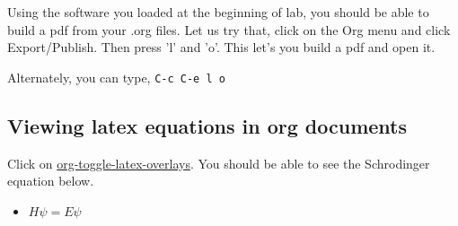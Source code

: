 \documentclass[11pt]{article}
\begin{document}
Using the software you loaded at the beginning of lab, you should be able to build a pdf from your .org files. Let us try that, click on the Org menu and click Export/Publish. Then press 'l' and 'o'. This let's you build a pdf and open it.

Alternately, you can type, \verb~C-c C-e l o~


\subsection{Viewing latex equations in org documents}
\label{sec-8-2}

Click on \url{org-toggle-latex-overlays}. You should be able to see the Schrodinger equation below.

\begin{itemize}
\item $H\psi = E\psi$
\end{itemize}
\end{document}
